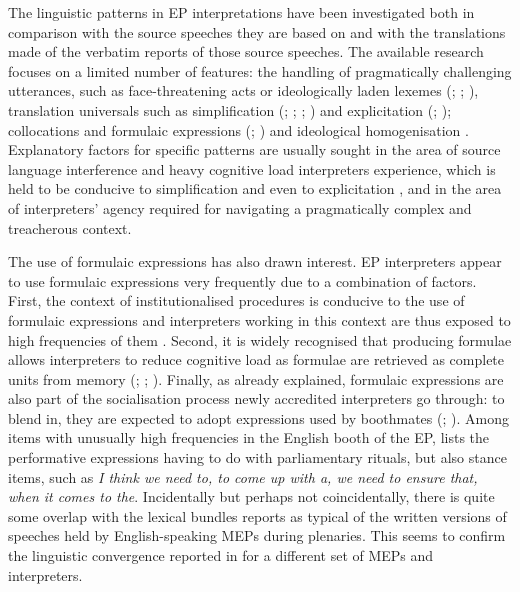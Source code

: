 \documentclass[output=paper]{langscibook}
\begin{document}
The linguistic patterns in EP interpretations have been investigated both in comparison with the source speeches they are based on and with the translations made of the verbatim reports of those source speeches. The available research focuses on a limited number of features: the handling of pragmatically challenging utterances, such as face-threatening acts or ideologically laden lexemes (\citealt{BeatonThome2013}; \citealt{Bartlomiejczyk2016, bartlomiejczyk_parliamentary_2020}; \citealt{MagnificoDefrancq2017}), translation universals such as simplification (\citealt{RussoEtAl2006}; \citealt{KajzerWietrzny2012}; \citealt{FerraresiMilicevic2017}; \citealt{BernardiniEtAl2016}) and explicitation (\citealt{KajzerWietrzny2012}; \citealt{DefrancqEtAl2015}); collocations and formulaic expressions (\citealt{FerraresiMilicevic2017}; \citealt{Aston2018})  and ideological homogenisation \citep{Beaton-Thome2007}. Explanatory factors for specific patterns are usually sought in the area of source language interference and heavy cognitive load interpreters experience, which is held to be conducive to simplification and even to explicitation \citep{FerraresiMilicevic2017}, and in the area of interpreters’ agency required for navigating a pragmatically complex and treacherous context. 

The use of formulaic expressions has also drawn interest. EP interpreters appear to use formulaic expressions very frequently \citep{Aston2018} due to a combination of factors. First, the context of institutionalised procedures is conducive to the use of formulaic expressions and interpreters working in this context are thus exposed to high frequencies of them \citep{Bartlomiejczyk2016}. Second, it is widely recognised that producing formulae allows interpreters to reduce cognitive load as formulae are retrieved as complete units from memory (\citealt{Gile1995}; \citealt{Setton1999}; \citealt{plevoets_cognitive_2018}). Finally, as already explained, formulaic expressions are also part of the socialisation process newly accredited interpreters go through: to blend in, they are expected to adopt expressions used by boothmates (\citealt{Bartlomiejczyk2016}; \citealt{Duflou2016}). Among items with unusually high frequencies in the English booth of the EP, \citet{Aston2018} lists the performative expressions having to do with parliamentary rituals, but also stance items, such as \textit{I think we need to, to come up with a, we need to ensure that, when it comes to the}. Incidentally but perhaps not coincidentally, there is quite some overlap with the lexical bundles \citet{granger_lexical_2014} reports as typical of the written versions of speeches held by English-speaking MEPs during plenaries. This seems to confirm the linguistic convergence reported in  for a different set of MEPs and interpreters.
\end{document}
